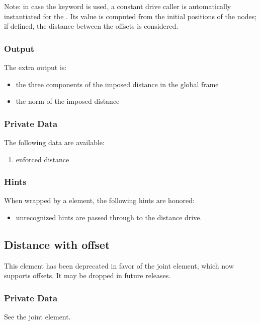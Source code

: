 Note: in case the keyword  is used, a constant drive
caller is automatically instantiated for the . 
Its value is computed from the initial positions of the nodes;
if defined, the distance between the offsets is considered. 

\subsubsection{Output}
The extra output is:
\begin{itemize}
    \item the three components of the imposed distance in the global frame
    \item the norm of the imposed distance
\end{itemize}

\subsubsection{Private Data}
The following data are available:
\begin{enumerate}
\item {} enforced distance
\end{enumerate}

\subsubsection{Hints}
When wrapped by a  element, the following hints are honored:
\begin{itemize}
\item unrecognized hints are passed through to the distance drive.
\end{itemize}



\subsection{Distance with offset}
This element has been deprecated in favor of the 
joint element, which now supports offsets.
It may be dropped in future releases.

\subsubsection{Private Data}
See the  joint element.



